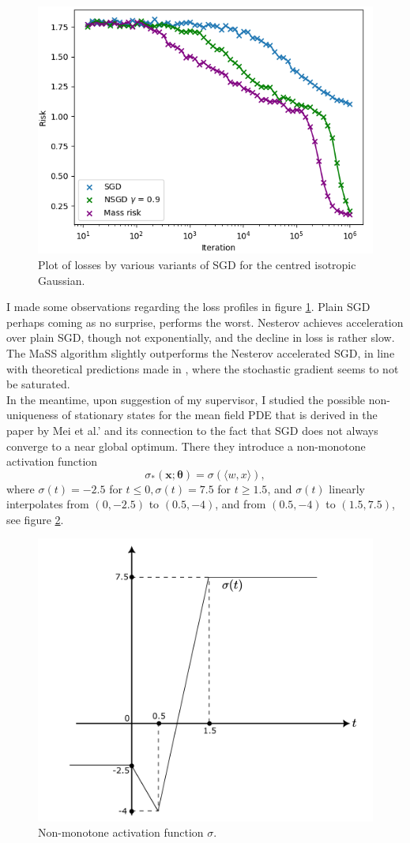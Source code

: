 \documentclass{article}
\theoremstyle{mystyle}
\newcommand{\bracket}[2]{\langle #1, #2\rangle}
\begin{document}
\begin{figure}
    \centering
    \includegraphics[width=0.6\linewidth]{images/Nguyen2018-SGD-algos-risk-iso-gauss.png}
    \caption{Plot of losses by various variants of SGD for the centred isotropic Gaussian.}
    \label{fig: SGD iso gauss losses}
\end{figure}

I made some observations regarding the loss profiles in figure \ref{fig: SGD iso gauss losses}. Plain SGD perhaps coming as no surprise, performs the worst. Nesterov achieves acceleration over plain SGD, though not exponentially, and the decline in loss is rather slow. The MaSS algorithm slightly outperforms the Nesterov accelerated SGD, in line with theoretical predictions made in \cite{liu2019acceleratingsgdmomentumoverparameterized}, where the stochastic gradient seems to not be saturated.\\

In the meantime, upon suggestion of my supervisor, I studied the possible non-uniqueness of stationary states for the mean field PDE that is derived in the paper by Mei et al.’ and its connection to the fact that SGD does not always converge to a near global optimum. There they introduce a non-monotone activation function
\begin{equation}
	\sigma_*( \mathbf{x}; \mathbf{\theta})= \sigma(\bracket{w}{x}), 
\end{equation}
where $\sigma(t) = -2.5$ for $t \leq 0, \sigma(t) = 7.5$ for $t \geq 1.5$, and $\sigma(t)$ linearly
interpolates from $(0, -2.5)$ to $(0.5, -4)$, and from $(0.5, -4)$ to $(1.5, 7.5)$, see figure \ref{fig: non-monotone activation fn}.

\begin{figure}[H]
    \centering
    \includegraphics[width=0.6\linewidth]{images/non-monotone-activation.png}
    \caption{Non-monotone activation function $\sigma$.}
    \label{fig: non-monotone activation fn}
\end{figure}
\end{document}
